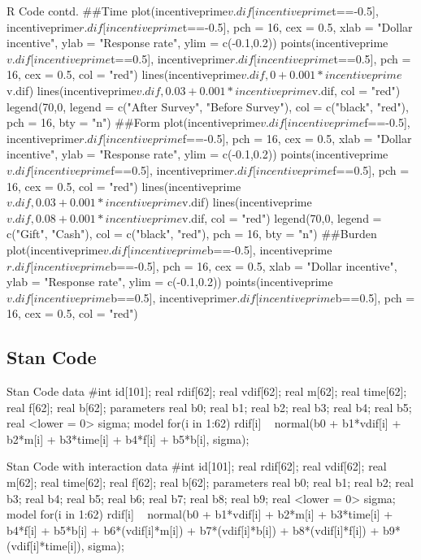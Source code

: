 \documentclass{article}
\begin{document}
\begin{sexylisting}{R Code contd.}
##Time
plot(incentiveprime$v.dif[incentiveprime$t==-0.5],
     incentiveprime$r.dif[incentiveprime$t==-0.5], pch = 16, 
     cex = 0.5,
     xlab = "Dollar incentive",
     ylab = "Response rate",
     ylim = c(-0.1,0.2))
points(incentiveprime$v.dif[incentiveprime$t==0.5],
       incentiveprime$r.dif[incentiveprime$t==0.5], pch = 16, 
       cex = 0.5, 
       col = "red")
lines(incentiveprime$v.dif, 0 + 0.001*incentiveprime$v.dif)
lines(incentiveprime$v.dif, 0.03 + 0.001*incentiveprime$v.dif, 
col = "red")
legend(70,0, legend =  c("After Survey", "Before Survey"), 
       col = c("black", "red"), pch = 16, bty = "n")
##Form
plot(incentiveprime$v.dif[incentiveprime$f==-0.5],
     incentiveprime$r.dif[incentiveprime$f==-0.5], pch = 16, 
     cex = 0.5,
     xlab = "Dollar incentive",
     ylab = "Response rate",
     ylim = c(-0.1,0.2))
points(incentiveprime$v.dif[incentiveprime$f==0.5],
       incentiveprime$r.dif[incentiveprime$f==0.5], pch = 16, 
       cex = 0.5, col = "red")
lines(incentiveprime$v.dif, 0.03 + 0.001*incentiveprime$v.dif)
lines(incentiveprime$v.dif, 0.08 + 0.001*incentiveprime$v.dif, 
col = "red")
legend(70,0, legend =  c("Gift", "Cash"), 
       col = c("black", "red"), pch = 16, bty = "n")
##Burden
plot(incentiveprime$v.dif[incentiveprime$b==-0.5],
     incentiveprime$r.dif[incentiveprime$b==-0.5], pch = 16, 
     cex = 0.5,
     xlab = "Dollar incentive",
     ylab = "Response rate",
     ylim = c(-0.1,0.2))
points(incentiveprime$v.dif[incentiveprime$b==0.5],
       incentiveprime$r.dif[incentiveprime$b==0.5], pch = 16, 
       cex = 0.5, 
       col = "red")
\end{sexylisting}
\subsection{Stan Code}
\begin{sexylisting}{Stan Code}
data{
  #int id[101];
  real rdif[62];
  real vdif[62];
  real m[62];
  real time[62];
  real f[62];
  real b[62];
  }
parameters{
  real b0;
  real b1;
  real b2;
  real b3;
  real b4;
  real b5;
  real <lower = 0> sigma;
}
model{
for(i in 1:62){
  rdif[i] ~ normal(b0 + b1*vdif[i] + b2*m[i] + b3*time[i] + 
  b4*f[i] + b5*b[i], sigma);
    }
}
\end{sexylisting}
\begin{sexylisting}{Stan Code with interaction}
data{
  #int id[101];
  real rdif[62];
  real vdif[62];
  real m[62];
  real time[62];
  real f[62];
  real b[62];
  }
parameters{
  real b0;
  real b1;
  real b2;
  real b3;
  real b4;
  real b5;
  real b6;
  real b7;
  real b8;
  real b9;
  real <lower = 0> sigma;
}
model{
for(i in 1:62){
  rdif[i] ~ normal(b0 + b1*vdif[i] + b2*m[i] + b3*time[i] + b4*f[i] 
  + b5*b[i] + b6*(vdif[i]*m[i]) + b7*(vdif[i]*b[i]) + 
  b8*(vdif[i]*f[i]) 
  + b9*(vdif[i]*time[i]), sigma);
    }
}
\end{sexylisting}
\end{document}
